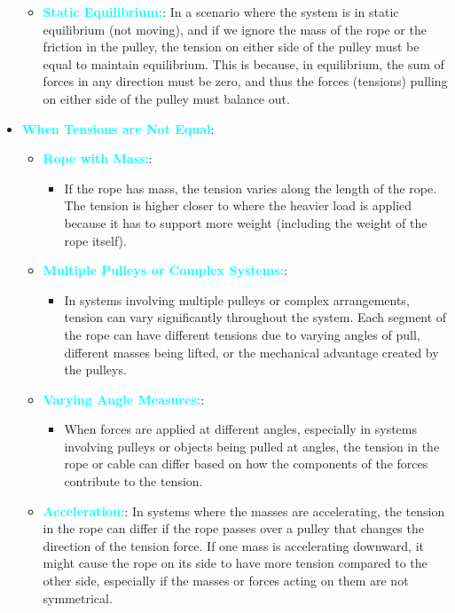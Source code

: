 \documentclass{report}
\begin{document}
\begin{itemize}
\begin{itemize}
                \item \textbf{\textcolor{cyan}{Static Equilibrium:}}: In a scenario where the system is in static equilibrium (not moving), and if we ignore the mass of the rope or the friction in the pulley, the tension on either side of the pulley must be equal to maintain equilibrium. This is because, in equilibrium, the sum of forces in any direction must be zero, and thus the forces (tensions) pulling on either side of the pulley must balance out.
            \end{itemize}
        \item \textbf{\textcolor{cyan}{When Tensions are Not Equal}}:
            \begin{itemize}
                \item \textbf{\textcolor{cyan}{Rope with Mass:}}:
                    \begin{itemize}
                        \item If the rope has mass, the tension varies along the length of the rope. The tension is higher closer to where the heavier load is applied because it has to support more weight (including the weight of the rope itself).
                    \end{itemize}
                \item \textbf{\textcolor{cyan}{Multiple Pulleys or Complex Systems:}}:
                    \begin{itemize}
                        \item In systems involving multiple pulleys or complex arrangements, tension can vary significantly throughout the system. Each segment of the rope can have different tensions due to varying angles of pull, different masses being lifted, or the mechanical advantage created by the pulleys. 
                    \end{itemize}
                \item \textbf{\textcolor{cyan}{Varying Angle Measures:}}:
                    \begin{itemize}
                        \item When forces are applied at different angles, especially in systems involving pulleys or objects being pulled at angles, the tension in the rope or cable can differ based on how the components of the forces contribute to the tension.
                    \end{itemize}
                \item \textbf{\textcolor{cyan}{Acceleration:}}: In systems where the masses are accelerating, the tension in the rope can differ if the rope passes over a pulley that changes the direction of the tension force. If one mass is accelerating downward, it might cause the rope on its side to have more tension compared to the other side, especially if the masses or forces acting on them are not symmetrical.

\end{itemize}
\end{itemize}
\end{document}
